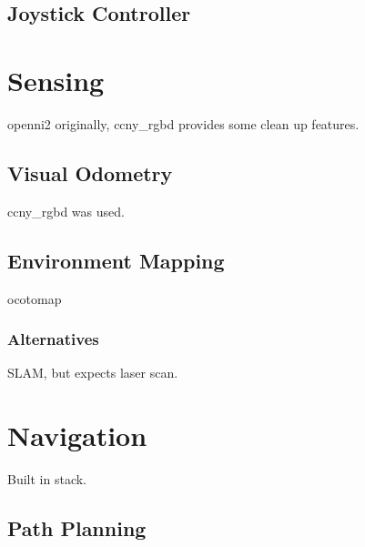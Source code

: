 \subsection{Joystick Controller}


\section{Sensing}

openni2 originally, ccny\_rgbd \cite{ccny_rgbd} provides some clean up features.

\subsection{Visual Odometry}

ccny\_rgbd \cite{ccny_rgbd} was used.

\subsection{Environment Mapping}

ocotomap

\subsubsection{Alternatives}

SLAM, but expects laser scan.


\section{Navigation}

Built in stack.

\subsection{Path Planning}
